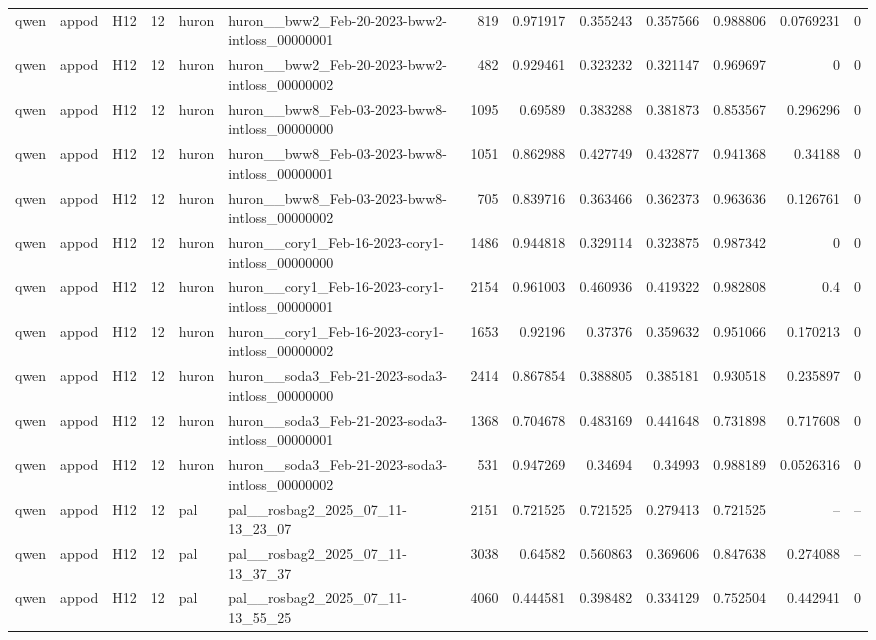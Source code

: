 \begin{longtable}{lllrllrrrrrrr}
qwen & appod & H12 & 12 & huron & huron\_\_bww2\_Feb-20-2023-bww2-intloss\_00000001 & 819 & 0.971917 & 0.355243 & 0.357566 & 0.988806 & 0.0769231 & 0 \\
qwen & appod & H12 & 12 & huron & huron\_\_bww2\_Feb-20-2023-bww2-intloss\_00000002 & 482 & 0.929461 & 0.323232 & 0.321147 & 0.969697 & 0 & 0 \\
qwen & appod & H12 & 12 & huron & huron\_\_bww8\_Feb-03-2023-bww8-intloss\_00000000 & 1095 & 0.69589 & 0.383288 & 0.381873 & 0.853567 & 0.296296 & 0 \\
qwen & appod & H12 & 12 & huron & huron\_\_bww8\_Feb-03-2023-bww8-intloss\_00000001 & 1051 & 0.862988 & 0.427749 & 0.432877 & 0.941368 & 0.34188 & 0 \\
qwen & appod & H12 & 12 & huron & huron\_\_bww8\_Feb-03-2023-bww8-intloss\_00000002 & 705 & 0.839716 & 0.363466 & 0.362373 & 0.963636 & 0.126761 & 0 \\
qwen & appod & H12 & 12 & huron & huron\_\_cory1\_Feb-16-2023-cory1-intloss\_00000000 & 1486 & 0.944818 & 0.329114 & 0.323875 & 0.987342 & 0 & 0 \\
qwen & appod & H12 & 12 & huron & huron\_\_cory1\_Feb-16-2023-cory1-intloss\_00000001 & 2154 & 0.961003 & 0.460936 & 0.419322 & 0.982808 & 0.4 & 0 \\
qwen & appod & H12 & 12 & huron & huron\_\_cory1\_Feb-16-2023-cory1-intloss\_00000002 & 1653 & 0.92196 & 0.37376 & 0.359632 & 0.951066 & 0.170213 & 0 \\
qwen & appod & H12 & 12 & huron & huron\_\_soda3\_Feb-21-2023-soda3-intloss\_00000000 & 2414 & 0.867854 & 0.388805 & 0.385181 & 0.930518 & 0.235897 & 0 \\
qwen & appod & H12 & 12 & huron & huron\_\_soda3\_Feb-21-2023-soda3-intloss\_00000001 & 1368 & 0.704678 & 0.483169 & 0.441648 & 0.731898 & 0.717608 & 0 \\
qwen & appod & H12 & 12 & huron & huron\_\_soda3\_Feb-21-2023-soda3-intloss\_00000002 & 531 & 0.947269 & 0.34694 & 0.34993 & 0.988189 & 0.0526316 & 0 \\
qwen & appod & H12 & 12 & pal & pal\_\_rosbag2\_2025\_07\_11-13\_23\_07 & 2151 & 0.721525 & 0.721525 & 0.279413 & 0.721525 & -- & -- \\
qwen & appod & H12 & 12 & pal & pal\_\_rosbag2\_2025\_07\_11-13\_37\_37 & 3038 & 0.64582 & 0.560863 & 0.369606 & 0.847638 & 0.274088 & -- \\
qwen & appod & H12 & 12 & pal & pal\_\_rosbag2\_2025\_07\_11-13\_55\_25 & 4060 & 0.444581 & 0.398482 & 0.334129 & 0.752504 & 0.442941 & 0 \\

\end{longtable}
